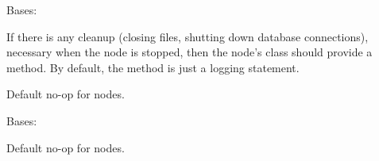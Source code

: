 \documentclass[letterpaper,10pt,english]{sphinxmanual}
\begin{document}

\begin{fulllineitems}
\label{\detokenize{api:nanostream.node.BatchMessages}}
Bases: {\hyperref[\detokenize{api:nanostream.node.NanoNode}]{}}

\begin{fulllineitems}
\label{\detokenize{api:nanostream.node.BatchMessages.cleanup}}
If there is any cleanup (closing files, shutting down database connections),
necessary when the node is stopped, then the node’s class should provide
a  method. By default, the method is just a logging statement.

\end{fulllineitems}


\begin{fulllineitems}
\label{\detokenize{api:nanostream.node.BatchMessages.process_item}}
Default no-op for nodes.

\end{fulllineitems}


\end{fulllineitems}


\begin{fulllineitems}
\label{\detokenize{api:nanostream.node.CSVReader}}
Bases: {\hyperref[\detokenize{api:nanostream.node.NanoNode}]{}}

\begin{fulllineitems}
\label{\detokenize{api:nanostream.node.CSVReader.process_item}}
Default no-op for nodes.

\end{fulllineitems}


\end{fulllineitems}
\end{document}
